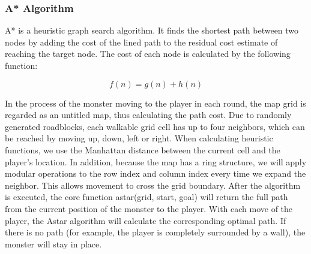 \subsubsection{A* Algorithm}

A* is a heuristic graph search algorithm. It finds the shortest path between two nodes by adding the cost of the lined path to the residual cost estimate of reaching the target node. The cost of each node is calculated by the following function:

\[
f(n) = g(n) + h(n)
\]

In the process of the monster moving to the player in each round, the map grid is regarded as an untitled map, thus calculating the path cost. Due to randomly generated roadblocks, each walkable grid cell has up to four neighbors, which can be reached by moving up, down, left or right. When calculating heuristic functions, we use the Manhattan distance between the current cell and the player's location. In addition, because the map has a ring structure, we will apply modular operations to the row index and column index every time we expand the neighbor. This allows movement to cross the grid boundary. After the algorithm is executed, the core function astar(grid, start, goal) will return the full path from the current position of the monster to the player. With each move of the player, the Astar algorithm will calculate the corresponding optimal path. If there is no path (for example, the player is completely surrounded by a wall), the monster will stay in place.


